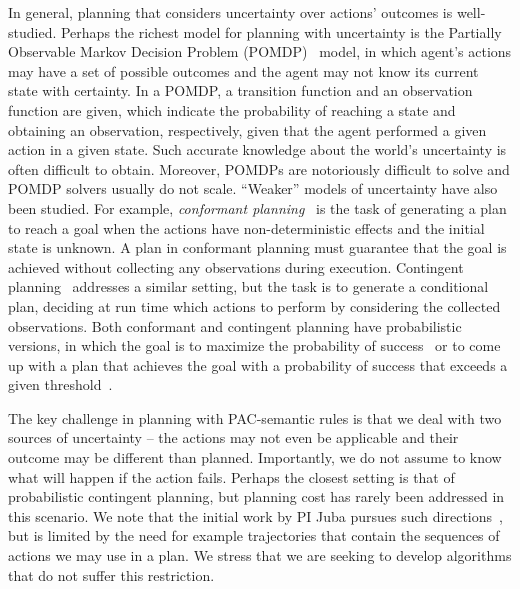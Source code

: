 \documentclass[12pt]{article}
\newcommand{\note}[1]{\textbf{\textit{#1}}}
\begin{document}
In general, planning that considers uncertainty over actions' outcomes is well-studied. Perhaps the richest model for planning with uncertainty is the Partially Observable Markov Decision Problem (POMDP)~\cite{cassandra1994acting}
model, in which agent's actions may have a set of possible outcomes and the agent may not know its current state with certainty. 
In a POMDP, a transition function and an observation function are given, which indicate the probability of reaching a state and obtaining an observation, respectively, given that the agent performed a given action in a given state. Such accurate knowledge about the world's uncertainty is often difficult to obtain. Moreover, POMDPs are notoriously difficult to solve and POMDP solvers usually do not scale. %
``Weaker'' models of uncertainty have also been studied. 
For example, {\em conformant planning}~\cite{hoffmann2006conformant,cimatti2004conformant,cimatti1999conformant} is the task of generating a plan to reach a goal when the actions have non-deterministic effects
and the initial state is unknown. A plan in conformant planning must guarantee that the goal is achieved without collecting any observations during execution. Contingent planning~\cite{hoffmann2005contingent,majercik2003contingent} addresses a similar setting, but the task is to generate a conditional plan, deciding at run time which actions to perform by considering the collected observations. 
Both conformant and contingent planning have probabilistic versions,
in which the goal is to maximize the probability of success~\cite{blum1999probabilistic,taig2015compilation,markou2016cost} 
or to come up with a plan that achieves the goal with a probability of success that exceeds a given threshold~\cite{kushmerick1995algorithm}.

The key challenge in planning with PAC-semantic rules is that
we deal with two sources of uncertainty -- the actions  may not even be applicable and their outcome may be different than planned. Importantly, we do not assume to know what will happen if the action fails. Perhaps the closest setting is that of probabilistic contingent planning, but planning cost has rarely been addressed in this scenario. We note that the initial work by PI Juba pursues such directions~\cite{juba2016jmlr}, but is limited by the need for example trajectories that contain the sequences of actions we may use in a plan. We stress that we are seeking to develop algorithms that do not suffer this restriction.
\end{document}
